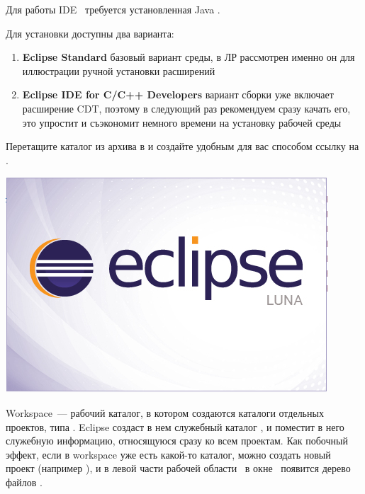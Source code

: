 \label{eclipseinstall}

\bigskip
Для работы IDE \eclipse\ требуется установленная Java .

\bigskip
Для установки доступны два варианта:
\begin{enumerate}
\item \textbf{Eclipse Standard} базовый вариант среды, в ЛР рассмотрен именно он для иллюстрации 
ручной установки расширений
\item \textbf{Eclipse IDE for C/C++ Developers} вариант сборки 
уже включает расширение CDT, поэтому в следующий раз рекомендуем сразу качать его,
это упростит и съэкономит немного времени на установку рабочей среды
\end{enumerate}

\bigskip{}

\bigskip{}

\bigskip Перетащите каталог  из архива в  и
создайте удобным для вас способом ссылку на .

\bigskip\includegraphics[height=0.3\textheight]{fig/EclipseSplash.png}

\bigskip Workspace\ --- рабочий каталог, в котором создаются каталоги отдельных
проектов, типа . Eclipse создаст в нем служебный каталог
, и поместит в него служебную информацию, относящуюся сразу ко
всем проектам. Как побочный эффект, если в workspace уже есть какой-то каталог,
можно создать новый проект (например ), и в левой части рабочей
области \eclipse\ в окне \ появится дерево файлов
.

